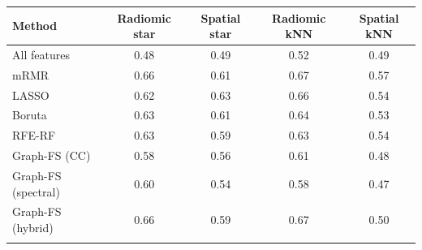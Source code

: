 \begin{tabular}{@{}lcccc@{}}
\toprule
Method & Radiomic star & Spatial star & Radiomic kNN & Spatial kNN \\
\midrule
All features & 0.48 & 0.49 & 0.52 & 0.49 \\
mRMR & 0.66 & 0.61 & 0.67 & 0.57 \\
LASSO & 0.62 & 0.63 & 0.66 & 0.54 \\
Boruta & 0.63 & 0.61 & 0.64 & 0.53 \\
RFE-RF & 0.63 & 0.59 & 0.63 & 0.54 \\
Graph-FS (CC) & 0.58 & 0.56 & 0.61 & 0.48 \\
Graph-FS (spectral) & 0.60 & 0.54 & 0.58 & 0.47 \\
Graph-FS (hybrid) & 0.66 & 0.59 & 0.67 & 0.50 \\
\botrule
\end{tabular}
